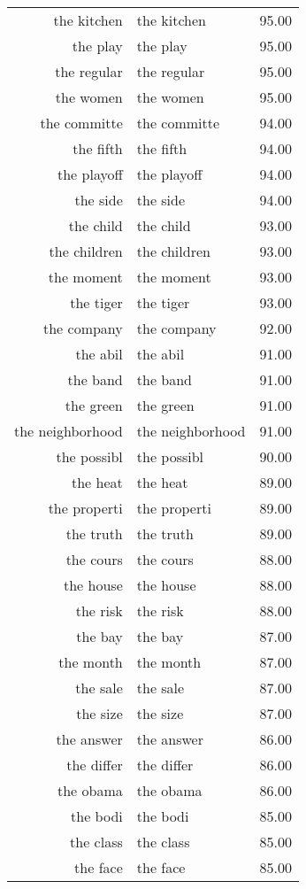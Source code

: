 \begin{table}[ht]
\begin{tabular}{rlr}
  the kitchen & the kitchen & 95.00 \\ 
  the play & the play & 95.00 \\ 
  the regular & the regular & 95.00 \\ 
  the women & the women & 95.00 \\ 
  the committe & the committe & 94.00 \\ 
  the fifth & the fifth & 94.00 \\ 
  the playoff & the playoff & 94.00 \\ 
  the side & the side & 94.00 \\ 
  the child & the child & 93.00 \\ 
  the children & the children & 93.00 \\ 
  the moment & the moment & 93.00 \\ 
  the tiger & the tiger & 93.00 \\ 
  the company & the company & 92.00 \\ 
  the abil & the abil & 91.00 \\ 
  the band & the band & 91.00 \\ 
  the green & the green & 91.00 \\ 
  the neighborhood & the neighborhood & 91.00 \\ 
  the possibl & the possibl & 90.00 \\ 
  the heat & the heat & 89.00 \\ 
  the properti & the properti & 89.00 \\ 
  the truth & the truth & 89.00 \\ 
  the cours & the cours & 88.00 \\ 
  the house & the house & 88.00 \\ 
  the risk & the risk & 88.00 \\ 
  the bay & the bay & 87.00 \\ 
  the month & the month & 87.00 \\ 
  the sale & the sale & 87.00 \\ 
  the size & the size & 87.00 \\ 
  the answer & the answer & 86.00 \\ 
  the differ & the differ & 86.00 \\ 
  the obama & the obama & 86.00 \\ 
  the bodi & the bodi & 85.00 \\ 
  the class & the class & 85.00 \\ 
  the face & the face & 85.00 \\ 

\end{tabular}
\end{table}
